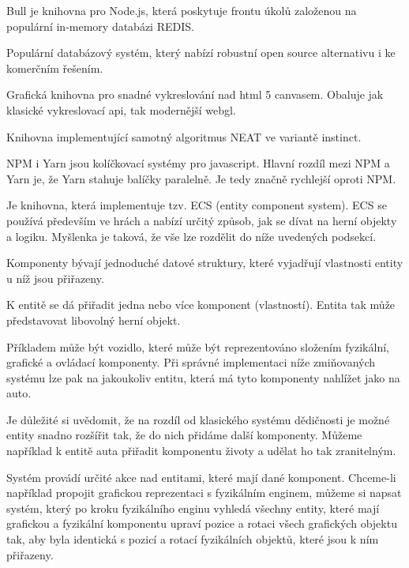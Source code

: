 Bull je knihovna pro Node.js, která poskytuje frontu úkolů založenou na populární in-memory databázi REDIS.

Populární databázový systém, který nabízí robustní open source alternativu i ke komerčním řešením.

Grafická knihovna pro snadné vykreslování nad html 5 canvasem. Obaluje jak klasické vykreslovací api, tak modernější webgl.

Knihovna implementující samotný algoritmus NEAT ve variantě instinct.

NPM i Yarn jsou kolíčkovací systémy pro javascript. Hlavní rozdíl mezi NPM a Yarn je, že Yarn stahuje balíčky paralelně. Je tedy značně rychlejší oproti NPM. 

\label{sec:ces}
Je knihovna, která implementuje tzv. ECS (entity component system). ECS se používá především ve hrách a nabízí určitý způsob, jak se dívat na herní objekty a logiku. Myšlenka je taková, že vše lze rozdělit do níže uvedených podsekcí.

Komponenty bývají jednoduché datové struktury, které vyjadřují vlastnosti entity u níž jsou přiřazeny.

K entitě se dá přiřadit jedna nebo více komponent (vlastností). Entita tak může představovat libovolný herní objekt. 

Příkladem může být vozidlo, které může být reprezentováno složením fyzikální, grafické a ovládací komponenty. Při správné implementaci níže zmiňovaných systému lze pak na jakoukoliv entitu, která má tyto komponenty nahlížet jako na auto.

Je důležité si uvědomit, že na rozdíl od klasického systému dědičnosti je možné entity snadno rozšířit tak, že do nich přidáme další komponenty. Můžeme například k entitě auta přiřadit komponentu životy a udělat ho tak zranitelným.

Systém provádí určité akce nad entitami, které mají dané komponent. Chceme-li například propojit grafickou reprezentaci s fyzikálním enginem, můžeme si napsat systém, který po kroku fyzikálního enginu vyhledá všechny entity, které mají grafickou a fyzikální komponentu upraví pozice a rotaci všech grafických objektu tak, aby byla identická s pozicí a rotací fyzikálních objektů, které jsou k ním přiřazeny.